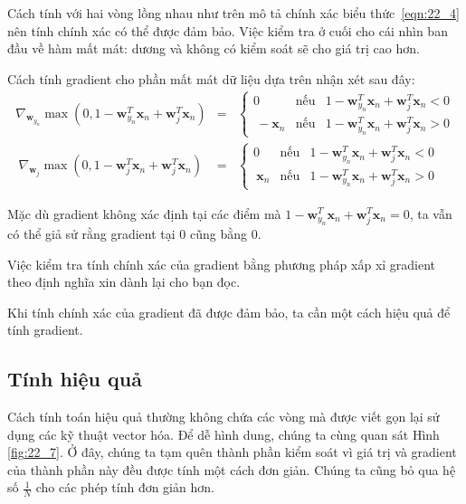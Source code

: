 Cách tính với hai vòng  lồng nhau như trên mô tả chính xác
biểu thức~\eqref{eqn:22_4} nên tính chính xác có thể được đảm bảo. Việc kiểm tra ở cuối cho cái nhìn ban đầu về hàm mất
mát: dương và không có kiểm soát sẽ cho giá trị cao hơn.

Cách tính gradient cho phần mất mát dữ liệu dựa trên nhận xét sau
đây:
\begin{eqnarray}
\label{eqn:22_5}
\nabla_{\mathbf{w}_{y_n}}\max(0, 1 - \mathbf{w}_{y_n}^T \mathbf{x}_n + \mathbf{w}_j^T\mathbf{x}_n) &=&
\left\{
\begin{matrix}
0 & \text{nếu}& 1 - \mathbf{w}_{y_n}^T \mathbf{x}_n + \mathbf{w}_j^T\mathbf{x}_n < 0 \\\
-\mathbf{x}_n & \text{nếu} &1 - \mathbf{w}_{y_n}^T \mathbf{x}_n + \mathbf{w}_j^T\mathbf{x}_n > 0
\end{matrix}
\right.\\\
\label{eqn:22_6}
\nabla_{\mathbf{w}_{j}}\max(0, 1 - \mathbf{w}_{j}^T \mathbf{x}_n + \mathbf{w}_j^T\mathbf{x}_n) &=&
\left\{
\begin{matrix}
0 & \text{nếu}& 1 - \mathbf{w}_{y_n}^T \mathbf{x}_n + \mathbf{w}_j^T\mathbf{x}_n < 0 \\\
\mathbf{x}_n & \text{nếu} &1 - \mathbf{w}_{y_n}^T \mathbf{x}_n + \mathbf{w}_j^T\mathbf{x}_n > 0
\end{matrix}
\right.
\end{eqnarray}

Mặc dù gradient không xác định tại các điểm mà $1 - \mathbf{w}_{y_n}^T \mathbf{x}_n + \mathbf{w}_j^T\mathbf{x}_n = 0$, ta vẫn có thể giả sử rằng gradient tại 0 cũng bằng 0.

Việc kiểm tra tính chính xác của gradient bằng phương pháp xấp xỉ gradient theo định nghĩa xin dành lại cho bạn đọc.

Khi tính chính xác của gradient đã được đảm bảo, ta cần một cách hiệu quả để tính gradient.



\subsection{Tính hiệu quả}


Cách tính toán hiệu quả thường không chứa các vòng  mà được
viết gọn lại sử dụng các kỹ thuật vector hóa. Để dễ hình dung, chúng ta cùng
quan sát Hình \ref{fig:22_7}. Ở đây, chúng ta tạm quên thành phần kiểm soát vì
giá trị và gradient của thành phần này đều được tính một cách đơn giản. Chúng ta cũng
bỏ qua hệ số $\frac{1}{N}$ cho các phép tính đơn giản hơn.


